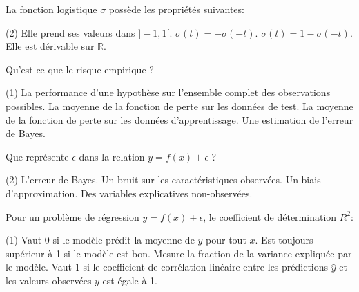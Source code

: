 \documentclass[solutions]{../cc}
\begin{document}
		\begin{question}
			La fonction logistique $\sigma$ possède les propriétés suivantes:
			\begin{tasks}(2)
				\task Elle prend ses valeurs dans $]-1, 1[$.
				\task $\sigma(t) = -\sigma(-t)$.
				\task $\sigma(t) = 1 - \sigma(-t)$.
				\task Elle est dérivable sur $\mathbb{R}$.
			\end{tasks}
		\end{question}

		\begin{question}
			Qu'est-ce que le risque empirique ?
			\begin{tasks}(1)
				\task La performance d'une hypothèse sur l'ensemble complet des observations possibles.
				\task La moyenne de la fonction de perte sur les données de test.
				\task La moyenne de la fonction de perte sur les données d'apprentissage.
				\task Une estimation de l'erreur de Bayes.
			\end{tasks}
		\end{question}

		\begin{question}
			Que représente $\epsilon$ dans la relation $y = f(x) + \epsilon$ ?
			\begin{tasks}(2)
				\task L'erreur de Bayes.
				\task Un bruit sur les caractéristiques observées.
				\task Un biais d'approximation.
				\task Des variables explicatives non-observées.
			\end{tasks}
		\end{question}

		\begin{question}
			Pour un problème de régression $y = f(x) + \epsilon$, le coefficient de détermination $R^2$:
			\begin{tasks}(1)
				\task Vaut 0 si le modèle prédit la moyenne de $y$ pour tout $x$.
				\task Est toujours supérieur à 1 si le modèle est bon.
				\task Mesure la fraction de la variance expliquée par le modèle.
				\task Vaut 1 si le coefficient de corrélation linéaire entre les prédictions $\hat{y}$ et les valeurs observées $y$ est égale à 1. 
			\end{tasks}
		\end{question}
\end{document}
